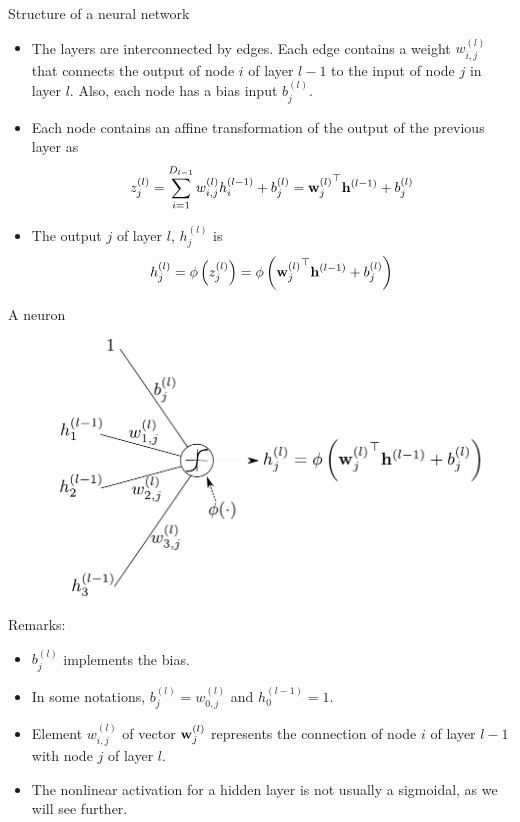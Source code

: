 \documentclass{beamer}
\begin{document}
\begin{frame}{Structure of a neural network}

\begin{itemize}
\item The layers are interconnected by edges. Each edge contains a weight $w^{(l)}_{i,j}$ that connects the output of node $i$ of layer $l-1$ to the input of node $j$ in layer $l$. Also, each node has a bias input $b^{(l)}_j$.\\
\item Each node contains an affine transformation of the output of the previous layer as
\begin{equation}
    z^{(l)}_j=\sum_{i=1}^{D_{l-1}} w_{i,j}^{(l)} h^{(l-1)}_{i}+b^{(l)}_{j}={{\bf w}_j^{(l)}}^\top  {\bf h}^{(l-1)}+b_j^{(l)} 
\end{equation}

\item The output $j$ of layer $l$, $h^{(l)}_j$ is 
\begin{equation}\label{eq:unit}
    h^{(l)}_j = \phi\left(z^{(l)}_j \right) = \phi\left({{\bf w}^{(l)}_j}^\top  {\bf h}^{(l-1)}+b^{(l)}_j\right) 
\end{equation}
\end{itemize}
\end{frame}

\begin{frame}{A neuron}
\begin{multicols}{2}

    \begin{center}
    \includegraphics[scale=0.35]{Module 1 (NN)/pics/neuron.pdf}
    \end{center}

Remarks:
\begin{itemize}
\item $b^{(l)}_j$ implements the bias. 
\item In some notations,  $b^{(l)}_j=w_{0,j}^{(l)}$ and $h^{(l-1)}_0=1$.
\item Element $w_{i,j}^{(l)}$ of vector ${\bf w}_{j}^{(l)}$ represents the connection of node $i$ of layer $l-1$ with node $j$ of layer $l$.

\end{itemize}
\end{multicols}
\begin{itemize}
    \item The nonlinear activation for a hidden layer is not usually a sigmoidal, as we will see further. 
\end{itemize}
\end{frame}
\end{document}
